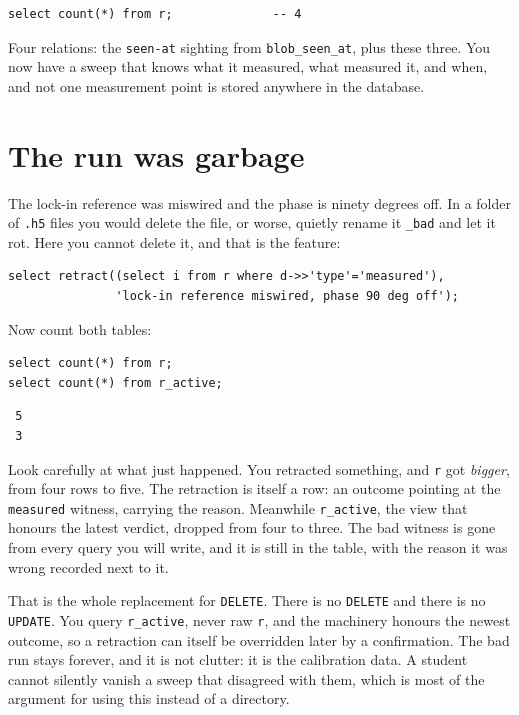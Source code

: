\begin{verbatim}
select count(*) from r;              -- 4
\end{verbatim}

Four relations: the \verb|seen-at| sighting from \verb|blob_seen_at|, plus these three. You now have a sweep that knows what it measured, what measured it, and when, and not one measurement point is stored anywhere in the database.

\section{The run was garbage}

The lock-in reference was miswired and the phase is ninety degrees off. In a folder of \verb|.h5| files you would delete the file, or worse, quietly rename it \verb|_bad| and let it rot. Here you cannot delete it, and that is the feature:

\begin{verbatim}
select retract((select i from r where d->>'type'='measured'),
               'lock-in reference miswired, phase 90 deg off');
\end{verbatim}

Now count both tables:

\begin{verbatim}
select count(*) from r;
select count(*) from r_active;
\end{verbatim}

\begin{verbatim}
 5
 3
\end{verbatim}

Look carefully at what just happened. You retracted something, and \verb|r| got \emph{bigger}, from four rows to five. The retraction is itself a row: an outcome pointing at the \verb|measured| witness, carrying the reason. Meanwhile \verb|r_active|, the view that honours the latest verdict, dropped from four to three. The bad witness is gone from every query you will write, and it is still in the table, with the reason it was wrong recorded next to it.

That is the whole replacement for \verb|DELETE|. There is no \verb|DELETE| and there is no \verb|UPDATE|. You query \verb|r_active|, never raw \verb|r|, and the machinery honours the newest outcome, so a retraction can itself be overridden later by a confirmation. The bad run stays forever, and it is not clutter: it is the calibration data. A student cannot silently vanish a sweep that disagreed with them, which is most of the argument for using this instead of a directory.

